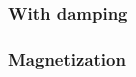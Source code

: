 \documentclass{beamer}
\begin{document}
\begin{frame}
    \frametitle{With damping}
\begin{figure}
    \centering
    
\end{figure}
\end{frame}

\begin{frame}
    \frametitle{Magnetization}
\begin{figure}
    \centering
    
\end{figure}
\end{frame}


\end{document}
